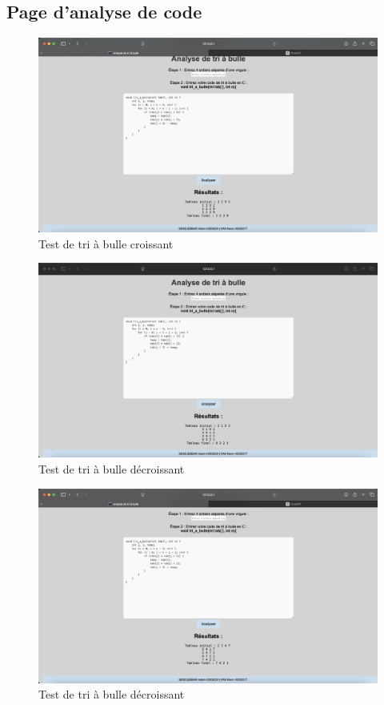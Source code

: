 \documentclass[a4paper, 12pt, twoside]{article}
\begin{document}
\subsection{Page d'analyse de code}
\begin{figure}[H]
    \centering
    \includegraphics[width=\textwidth]{croissant.png}
    \caption{Test de tri à bulle croissant}
    \label{fig:manuel3}
\end{figure}
\begin{figure}[H]
    \centering
    \includegraphics[width=\textwidth]{decroissant.png}
    \caption{Test de tri à bulle décroissant}
    \label{fig:manuel4}
\end{figure}
\begin{figure}[H]
    \centering
    \includegraphics[width=\textwidth]{decroissant 2.png}
    \caption{Test de tri à bulle décroissant}
    \label{fig:manuel5}
\end{figure}
\end{document}
